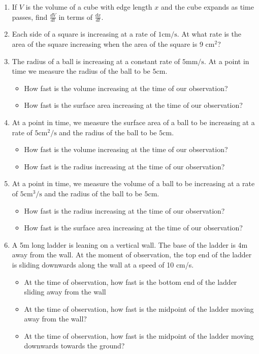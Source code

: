 \begin{enumerate}
\item \label{problemRelatedRatesCubeExpands}  If $V$ is the volume of a cube with edge length $x$ and the cube expands as time passes, find $\frac{dV}{dt}$ in terms of $\frac{dx}{dt}$.


\item \label{problemRelatedRatesSquareExpands} Each side of a square is increasing at a rate of $1\text{cm/s}$. At what rate is the area of the square increasing when the area of the square is 9 $\text{cm}^2$?
\item \label{problemRelatedRatesBallRadiusChanges} The radius of a ball is increasing at a constant rate of $5 \text{mm/s} $. At a point in time we measure the radius of the ball to be $5\text{cm}$.
\begin{itemize}
\item How fast is the volume increasing at the time of our observation?
\item How fast is the surface area increasing at the time of our observation?
\end{itemize}
\item \label{problemRelatedRatesBallSurfaceAreaChanges}  At a point in time, we measure the surface area of a ball to be increasing at a rate of $5\text{cm}^2/\text{s}$ and the radius of the ball to be $5 \text{cm}$.
\begin{itemize}
\item How fast is the volume increasing at the time of our observation?
\item How fast is the radius increasing at the time of our observation?
\end{itemize}
\item \label{problemRelatedRatesBallVolumeChanges} At a point in time, we measure the volume of a ball to be increasing at a rate of $5\text{cm}^3/\text{s}$ and the radius of the ball to be $5 \text{cm}$.
\begin{itemize}
\item How fast is the radius increasing at the time of our observation?
\item How fast is the surface area increasing at the time of our observation?
\end{itemize}

\item A 5m long ladder is leaning on a vertical wall. The base of the ladder is 4m away from the wall. At the moment of observation, the top end of the ladder is sliding downwards along the wall at a speed of 10 cm/s. 
\begin{itemize}
\item At the time of observation, how fast is the bottom end of the ladder sliding away from the wall 
\item At the time of observation, how fast is the midpoint of the ladder moving away from the wall?
\item At the time of observation, how fast is the midpoint of the ladder moving downwards towards the ground?


\end{itemize}
\end{enumerate}
